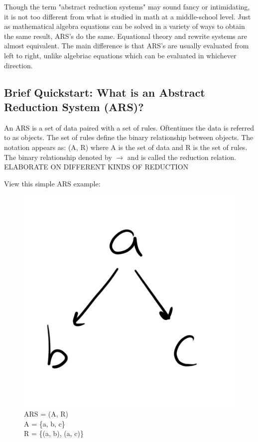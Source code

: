\documentclass{article}
\begin{document}
\medskip\noindent
Though the term "abstract reduction systems" may sound fancy or intimidating, it is not too different from what is studied in math at a middle-school level. Just as mathematical algebra equations can be solved in a variety of ways to obtain the same result, ARS's do the same. Equational theory and rewrite systems are almost equivalent. The main difference is that ARS's are usually evaluated from left to right, unlike algebriac equations which can be evaluated in whichever direction.


\subsection{Brief Quickstart: What is an Abstract Reduction System (ARS)?}

\medskip\noindent
An ARS is a set of data paired with a set of rules. Oftentimes the data is referred to as objects. The set of rules define the binary relationship between objects. The notation appears as: (A, R) where A is the set of data and R is the set of rules. The binary relationship denoted by $\rightarrow$ and is called the reduction relation. ELABORATE ON DIFFERENT KINDS OF REDUCTION

\medskip\noindent
View this simple ARS example:

\begin{figure}[h!]
  \centering
  \includegraphics[scale=0.06]{gen1}
  \caption[] {
     ARS = (A, R) \\ A = \{a, b, c\} \\ R = \{(a, b), (a, c)\}
    \endtabular}
\end{figure}
\end{document}
